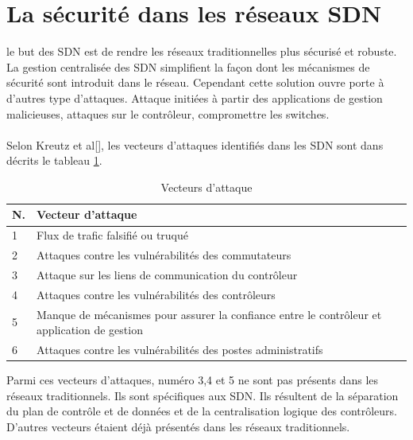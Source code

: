 \section{La sécurité dans les réseaux SDN}
le but des SDN est de rendre les réseaux traditionnelles plus sécurisé et robuste. La gestion centralisée des SDN simplifient la façon dont les mécanismes de sécurité sont introduit dans le réseau. Cependant cette solution ouvre porte à d'autres type d'attaques. Attaque initiées à partir des applications de gestion malicieuses, attaques sur le contrôleur, compromettre les switches.\\\\
Selon Kreutz et al[\cite{7}], les vecteurs d'attaques identifiés dans les SDN sont dans décrits le tableau \ref{table:Threat_Vectors}.
\newpage
\begin{table}[h]
\begin{center}
\begin{tabular}{  m{0.5cm} m{11cm} }
\hline
N. & Vecteur d'attaque\\
\hline
1 & Flux de trafic falsifié ou truqué\\
2 & Attaques contre les vulnérabilités des commutateurs\\
3 & Attaque sur les liens de communication du contrôleur\\
4 & Attaques contre les vulnérabilités des contrôleurs\\
5 & Manque de mécanismes pour assurer la confiance entre le contrôleur
et application de gestion\\
6 & Attaques contre les vulnérabilités des postes administratifs\\
\hline
\end{tabular}
\caption{Vecteurs d'attaque}
\label{table:Threat_Vectors}
\end{center}
\end{table}

Parmi ces vecteurs d'attaques, numéro 3,4 et 5 ne sont pas présents dans les réseaux traditionnels. Ils sont spécifiques aux SDN. Ils résultent de la séparation du plan de contrôle et de données et de la centralisation logique des contrôleurs. D'autres vecteurs étaient déjà présentés dans les réseaux traditionnels.

